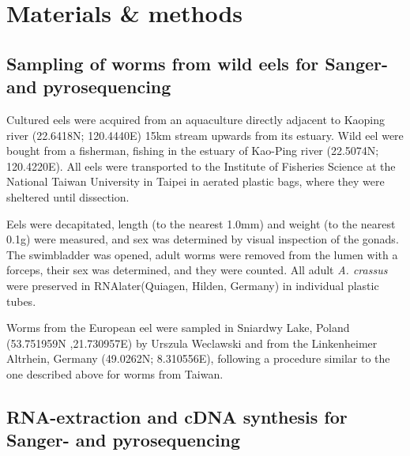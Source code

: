 

\chapter{Materials \& methods} %



\ifpdf
    \graphicspath{{8/figures/PNG/}{8/figures/PDF/}{8/figures/}}
\else
    \graphicspath{{8/figures/EPS/}{8/figures/}}
\fi



\section{Sampling of worms from wild eels for Sanger- and
  pyrosequencing}

Cultured eels were acquired from an aquaculture directly adjacent to
Kaoping river (22.6418N; 120.4440E) 15km stream upwards from its
estuary. Wild eel were bought from a fisherman, fishing in the estuary
of Kao-Ping river (22.5074N; 120.4220E). All eels were transported to
the Institute of Fisheries Science at the National Taiwan University
in Taipei in aerated plastic bags, where they were sheltered until
dissection.

Eels were decapitated, length (to the nearest 1.0mm) and weight (to
the nearest 0.1g) were measured, and sex was determined by visual
inspection of the gonads. The swimbladder was opened, adult worms were
removed from the lumen with a forceps, their sex was determined, and
they were counted. All adult \textit{A. crassus} were preserved in
RNAlater(Quiagen, Hilden, Germany) in individual plastic tubes.

Worms from the European eel were sampled in Sniardwy Lake, Poland
(53.751959N ,21.730957E) by Urszula Weclawski and from the
Linkenheimer Altrhein, Germany (49.0262N; 8.310556E), following a
procedure similar to the one described above for worms from Taiwan.

\section{RNA-extraction and cDNA synthesis for Sanger- and
  pyrosequencing}

